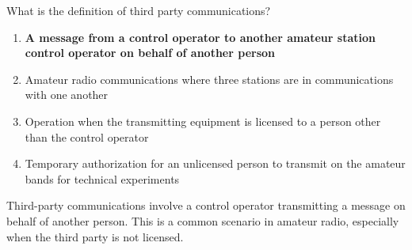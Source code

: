 \begin{tcolorbox}[colback=gray!10!white,colframe=black!75!black,title={T1F08}]
    What is the definition of third party communications?
    \begin{enumerate}[label=\Alph*),noitemsep]
        \item \textbf{A message from a control operator to another amateur station control operator on behalf of another person}
        \item Amateur radio communications where three stations are in communications with one another
        \item Operation when the transmitting equipment is licensed to a person other than the control operator
        \item Temporary authorization for an unlicensed person to transmit on the amateur bands for technical experiments
    \end{enumerate}
\end{tcolorbox}

Third-party communications involve a control operator transmitting a message on behalf of another person. This is a common scenario in amateur radio, especially when the third party is not licensed.
